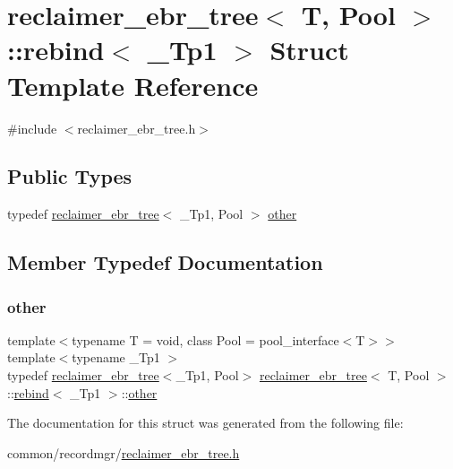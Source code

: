 \hypertarget{structreclaimer__ebr__tree_1_1rebind}{}\section{reclaimer\+\_\+ebr\+\_\+tree$<$ T, Pool $>$\+:\+:rebind$<$ \+\_\+\+Tp1 $>$ Struct Template Reference}
\label{structreclaimer__ebr__tree_1_1rebind}


{\ttfamily \#include $<$reclaimer\+\_\+ebr\+\_\+tree.\+h$>$}

\subsection*{Public Types}
\begin{DoxyCompactItemize}
\item 
typedef \hyperlink{classreclaimer__ebr__tree}{reclaimer\+\_\+ebr\+\_\+tree}$<$ \+\_\+\+Tp1, Pool $>$ \hyperlink{structreclaimer__ebr__tree_1_1rebind_ae240e8d3271ca8b6ae1a8a131bc1ad98}{other}
\end{DoxyCompactItemize}


\subsection{Member Typedef Documentation}
\mbox{\label{structreclaimer__ebr__tree_1_1rebind_ae240e8d3271ca8b6ae1a8a131bc1ad98}} 
\subsubsection{\texorpdfstring{other}{other}}
{\footnotesize\ttfamily template$<$typename T  = void, class Pool  = pool\+\_\+interface$<$\+T$>$$>$ \\
template$<$typename \+\_\+\+Tp1 $>$ \\
typedef \hyperlink{classreclaimer__ebr__tree}{reclaimer\+\_\+ebr\+\_\+tree}$<$\+\_\+\+Tp1, Pool$>$ \hyperlink{classreclaimer__ebr__tree}{reclaimer\+\_\+ebr\+\_\+tree}$<$ T, Pool $>$\+::\hyperlink{structreclaimer__ebr__tree_1_1rebind}{rebind}$<$ \+\_\+\+Tp1 $>$\+::\hyperlink{structreclaimer__ebr__tree_1_1rebind_ae240e8d3271ca8b6ae1a8a131bc1ad98}{other}}



The documentation for this struct was generated from the following file\+:\begin{DoxyCompactItemize}
\item 
common/recordmgr/\hyperlink{reclaimer__ebr__tree_8h}{reclaimer\+\_\+ebr\+\_\+tree.\+h}\end{DoxyCompactItemize}
